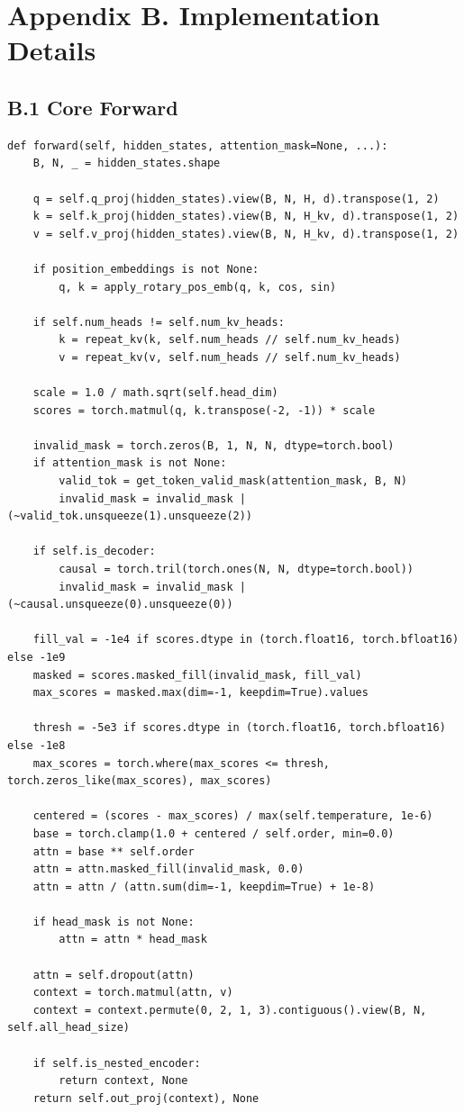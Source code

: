 \section{Appendix B. Implementation Details}

\subsection{B.1 Core Forward}

\begin{lstlisting}
def forward(self, hidden_states, attention_mask=None, ...):
    B, N, _ = hidden_states.shape
    
    q = self.q_proj(hidden_states).view(B, N, H, d).transpose(1, 2)
    k = self.k_proj(hidden_states).view(B, N, H_kv, d).transpose(1, 2)
    v = self.v_proj(hidden_states).view(B, N, H_kv, d).transpose(1, 2)
    
    if position_embeddings is not None:
        q, k = apply_rotary_pos_emb(q, k, cos, sin)
    
    if self.num_heads != self.num_kv_heads:
        k = repeat_kv(k, self.num_heads // self.num_kv_heads)
        v = repeat_kv(v, self.num_heads // self.num_kv_heads)
    
    scale = 1.0 / math.sqrt(self.head_dim)
    scores = torch.matmul(q, k.transpose(-2, -1)) * scale
    
    invalid_mask = torch.zeros(B, 1, N, N, dtype=torch.bool)
    if attention_mask is not None:
        valid_tok = get_token_valid_mask(attention_mask, B, N)
        invalid_mask = invalid_mask | (~valid_tok.unsqueeze(1).unsqueeze(2))
    
    if self.is_decoder:
        causal = torch.tril(torch.ones(N, N, dtype=torch.bool))
        invalid_mask = invalid_mask | (~causal.unsqueeze(0).unsqueeze(0))
    
    fill_val = -1e4 if scores.dtype in (torch.float16, torch.bfloat16) else -1e9
    masked = scores.masked_fill(invalid_mask, fill_val)
    max_scores = masked.max(dim=-1, keepdim=True).values
    
    thresh = -5e3 if scores.dtype in (torch.float16, torch.bfloat16) else -1e8
    max_scores = torch.where(max_scores <= thresh, torch.zeros_like(max_scores), max_scores)
    
    centered = (scores - max_scores) / max(self.temperature, 1e-6)
    base = torch.clamp(1.0 + centered / self.order, min=0.0)
    attn = base ** self.order
    attn = attn.masked_fill(invalid_mask, 0.0)
    attn = attn / (attn.sum(dim=-1, keepdim=True) + 1e-8)
    
    if head_mask is not None:
        attn = attn * head_mask
    
    attn = self.dropout(attn)
    context = torch.matmul(attn, v)
    context = context.permute(0, 2, 1, 3).contiguous().view(B, N, self.all_head_size)
    
    if self.is_nested_encoder:
        return context, None
    return self.out_proj(context), None
\end{lstlisting}


